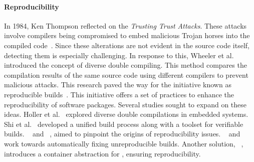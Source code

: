 \documentclass[smallextended]{svjour3}
\begin{document}
\paragraph{Reproducibility}
In 1984, Ken Thompson reflected on the \emph{Trusting Trust Attacks}. These attacks involve compilers being compromised to embed malicious Trojan horses into the compiled code~\cite{thompson1984reflections}. Since these alterations are not evident in the source code itself, detecting them is especially challenging. In response to this, Wheeler et al.~\cite{wheeler2005countering} introduced the concept of diverse double compiling. This method compares the compilation results of the same source code using different compilers to prevent malicious attacks. This research paved the way for the initiative known as reproducible builds~\cite{reproducibleBuilds}. This initiative offers a set of practices to enhance the reproducibility of software packages. Several studies sought to expand on these ideas. Holler et al.~\cite{holler2015evaluation} explored diverse double compilations in embedded systems. Shi et al.~\cite{shi2021experience} developed a unified build process along with a toolset for verifiable builds. ~\cite{ren2018automated} and ~\cite{ren2019root}, aimed to pinpoint the origins of reproducibility issues. ~\cite{Ren2022Automated} and ~\cite{he2020constbin} work towards automatically fixing unreproducible builds. Another solution, ~\cite{navarro2020reproducible}, introduces a container abstraction for , ensuring reproducibility.
\end{document}
